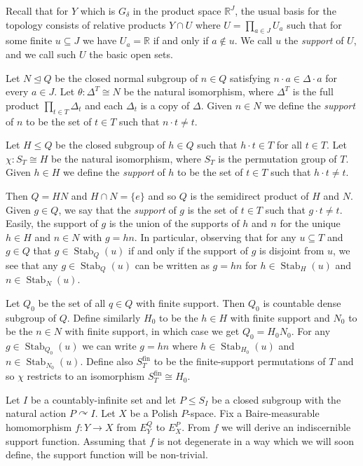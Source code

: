 \documentclass[12pt]{amsart}
\theoremstyle{plain}
\theoremstyle{definition}
\newcommand{\isom}{\cong}
\newcommand{\fin}{\text{fin}}
\DeclareMathOperator{\Stab}{Stab}
\begin{document}
Recall that for $Y$ which is $G_\delta$ in the product space $\mathbb{R}^J$, the usual basis for the topology consists of relative products $Y \cap U$ where $U = \prod_{a \in J} U_a$ such that for some finite $u \subseteq J$ we have $U_a = \mathbb{R}$ if and only if $a \not\in u$.
We call $u$ the \emph{support} of $U$, and we call such $U$ the basic open sets.

Let $N \trianglelefteq Q$ be the closed normal subgroup of $n \in Q$ satisfying $n \cdot a \in \Delta \cdot a$ for every $a \in J$.
Let $\theta : \Delta^T \isom N$ be the natural isomorphism, where $\Delta^T$ is the full product $\prod_{t \in T} \Delta_t$ and each $\Delta_t$ is a copy of $\Delta$.
Given $n \in N$ we define the \emph{support} of $n$ to be the set of $t \in T$ such that $n \cdot t \neq t$.

Let $H \le Q$ be the closed subgroup of $h \in Q$ such that $h \cdot t \in T$ for all $t \in T$.
Let $\chi : S_T \isom H$ be the natural isomorphism, where $S_T$ is the permutation group of $T$.
Given $h \in H$ we define the \emph{support} of $h$ to be the set of $t \in T$ such that $h \cdot t \neq t$.

Then $Q = HN$ and $H \cap N = \{e\}$ and so $Q$ is the semidirect product of $H$ and $N$.
Given $g \in Q$, we say that the \emph{support} of $g$ is the set of $t \in T$ such that $g \cdot t \neq t$.
Easily, the support of $g$ is the union of the supports of $h$ and $n$ for the unique $h \in H$ and $n \in N$ with $g = hn$.
In particular, observing that for any $u \subseteq T$ and $g \in Q$ that $g \in \Stab_Q(u)$ if and only if the support of $g$ is disjoint from $u$, we see that any $g \in \Stab_Q(u)$ can be written as $g = hn$ for $h \in \Stab_H(u)$ and $n \in \Stab_N(u)$.

Let $Q_0$ be the set of all $q \in Q$ with finite support.
Then $Q_0$ is countable dense subgroup of $Q$.
Define similarly $H_0$ to be the $h \in H$ with finite support and $N_0$ to be the $n \in N$ with finite support, in which case we get $Q_0 = H_0N_0$.
For any $g \in \Stab_{Q_0}(u)$ we can write $g = hn$ where $h \in \Stab_{H_0}(u)$ and $n \in \Stab_{N_0}(u)$.
Define also $S_T^{\fin}$ to be the finite-support permutations of $T$ and so $\chi$ restricts to an isomorphism $S_T^\fin \isom H_0$.

Let $I$ be a countably-infinite set and let $P \le S_I$ be a closed subgroup with the natural action $P \curvearrowright I$.
Let $X$ be a Polish $P$-space.
Fix a Baire-measurable homomorphism $f : Y \rightarrow X$ from $E^Q_Y$ to $E^P_X$.
From $f$ we will derive an indiscernible support function.
Assuming that $f$ is not degenerate in a way which we will soon define, the support function will be non-trivial.
\end{document}
